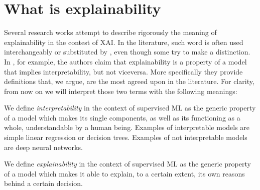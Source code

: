 \section{What is explainability}
\label{sec:whatisexplainability}
Several research works attempt to describe rigorously the meaning of explainability in the contest of XAI. In the literature, such word is often used interchangeably or substituted by , even though some try to make a distinction. In \cite{gilpin2018explaining}, for example, the authors claim that explainability is a property of a model that implies interpretability, but not viceversa. More specifically
they provide definitions that, we argue, are the most agreed upon in the literature. For clarity, from now on we will interpret those two terms with the following meanings:

\begin{definition}[Interpretability]
	\label{def:interpretability}
	We define \textit{interpretability} in the context of supervised ML as the generic property of a model which makes its single components, as well as its functioning as a whole, understandable by a human being. Examples of interpretable models are simple linear regression or decision trees. Examples of not interpretable models are deep neural networks.
\end{definition}

\begin{definition}[Explainability]
	\label{def:explainability}
	We define \textit{explainability} in the context of supervised ML as the generic property of a model which makes it able to explain, to a certain extent, its own reasons behind a certain decision.
\end{definition}

